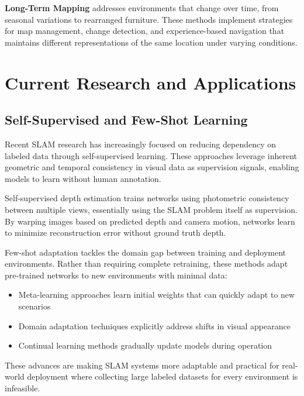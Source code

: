 \documentclass[12pt]{article}
\begin{document}
    \textbf{Long-Term Mapping} addresses environments that change over time, from seasonal variations to rearranged furniture. These methods implement strategies for map management, change detection, and experience-based navigation that maintains 
    different representations of the same location under varying conditions.
    
    \newpage
    \section{Current Research and Applications}

    \subsection{Self-Supervised and Few-Shot Learning}
    
    Recent SLAM research has increasingly focused on reducing dependency on labeled data through self-supervised learning. These approaches leverage inherent geometric and temporal
    consistency in visual data as supervision signals, enabling models to learn without human annotation.
    
    Self-supervised depth estimation trains networks using photometric consistency between multiple views, essentially using the SLAM problem itself as supervision. By warping images based on 
    predicted depth and camera motion, networks learn to minimize reconstruction error without ground truth depth.
    
    Few-shot adaptation tackles the domain gap between training and deployment environments. Rather than requiring complete retraining, these methods adapt pre-trained networks to new environments with minimal data:
    
    \begin{itemize}
        \item Meta-learning approaches learn initial weights that can quickly adapt to new scenarios
        \item Domain adaptation techniques explicitly address shifts in visual appearance
        \item Continual learning methods gradually update models during operation
    \end{itemize}
    
    These advances are making SLAM systems more adaptable and practical for real-world deployment where collecting large labeled datasets for every environment is infeasible.
    
\end{document}
